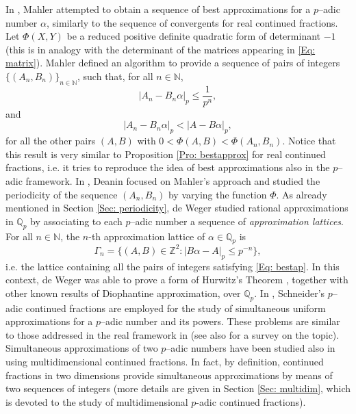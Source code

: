 \documentclass[12pt, reqno]{amsart}
\theoremstyle{plain}
\theoremstyle{definition}
\begin{document}
In \cite{MAH}, Mahler attempted to obtain a sequence of best approximations for a $p$--adic number $\alpha$, similarly to the sequence of convergents for real continued fractions. Let $\Phi(X,Y)$ be a reduced positive definite quadratic form of determinant $-1$ (this is in analogy with the determinant of the matrices appearing in \eqref{Eq: matrix}). Mahler defined an algorithm to provide a sequence of pairs of integers $\{(A_n,B_n)\}_{n\in\mathbb{N}}$, such that, for all $n\in\mathbb{N}$,
\begin{equation}\label{Eq: bestap}
    |A_n-B_n\alpha|_p\leq\frac{1}{p^n},
\end{equation}
and
\[|A_n-B_n\alpha|_p<|A-B\alpha|_p,\]
for all the other pairs $(A,B)$ with $0<\Phi(A,B)<\Phi(A_n,B_n)$. Notice that this result is very similar to Proposition \ref{Pro: bestapprox} for real continued fractions, i.e. it tries to reproduce the idea of best approximations also in the $p$--adic framework. In \cite{DEA}, Deanin focused on Mahler's approach and studied the periodicity of the sequence $(A_n,B_n)$ by varying the function $\Phi$. As already mentioned in Section \ref{Sec: periodicity}, de Weger \cite{DEWI} studied rational approximations in $\mathbb{Q}_p$ by associating to each $p$--adic number a sequence of \textit{approximation lattices}. For all $n\in\mathbb{N}$, the $n$-th approximation lattice of $\alpha\in\mathbb{Q}_p$ is
\[\Gamma_n=\{(A,B)\in\mathbb{Z}^2 : |B\alpha-A|_p\leq p^{-n}\},\]
i.e. the lattice containing all the pairs of integers satisfying \eqref{Eq: bestap}. In this context, de Weger was able to prove a form of Hurwitz's Theorem \cite{HUR}, together with other known results of Diophantine approximation, over $\mathbb{Q}_p$. In \cite{BUG,BUG2,BBDO,BAD}, Schneider's $p$--adic continued fractions are employed for the study of simultaneous uniform approximations for a $p$--adic number and its powers. These problems are similar to those addressed in the real framework in \cite{BUG0,LAU,BAD} (see also \cite{BUGEAUD} for a survey on the topic). Simultaneous approximations of two $p$--adic numbers have been studied also in \cite{MT3} using multidimensional continued fractions. In fact, by definition, continued fractions in two dimensions provide simultaneous approximations by means of two sequences of integers (more details are given in Section \ref{Sec: multidim}, which is devoted to the study of multidimensional $p$-adic continued fractions).
\end{document}

